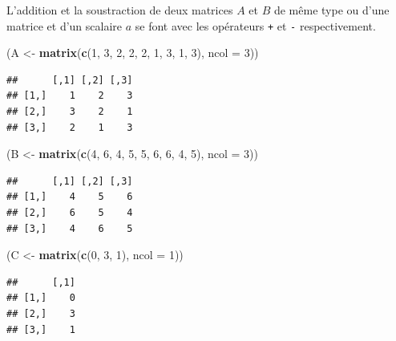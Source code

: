 \documentclass[
  11pt,
]{book}
\newenvironment{Shaded}{\begin{snugshade}}{\end{snugshade}}
\newcommand{\DataTypeTok}[1]{\textcolor[rgb]{0.13,0.29,0.53}{#1}}
\newcommand{\DecValTok}[1]{\textcolor[rgb]{0.00,0.00,0.81}{#1}}
\newcommand{\KeywordTok}[1]{\textcolor[rgb]{0.13,0.29,0.53}{\textbf{#1}}}
\newcommand{\NormalTok}[1]{#1}
\newcommand{\StringTok}[1]{\textcolor[rgb]{0.31,0.60,0.02}{#1}}
\numberwithin{equation}{section}
\numberwithin{countremarque}{section}
\begin{document}
L'addition et la soustraction de deux matrices \(A\) et \(B\) de même type ou d'une matrice et d'un scalaire \(a\) se font avec les opérateurs \texttt{+} et \texttt{-} respectivement.

\begin{Shaded}
\begin{Highlighting}[]
\NormalTok{(A \textless{}{-}}\StringTok{ }\KeywordTok{matrix}\NormalTok{(}\KeywordTok{c}\NormalTok{(}\DecValTok{1}\NormalTok{, }\DecValTok{3}\NormalTok{, }\DecValTok{2}\NormalTok{, }\DecValTok{2}\NormalTok{, }\DecValTok{2}\NormalTok{, }\DecValTok{1}\NormalTok{, }\DecValTok{3}\NormalTok{, }\DecValTok{1}\NormalTok{, }\DecValTok{3}\NormalTok{), }\DataTypeTok{ncol =} \DecValTok{3}\NormalTok{))}
\end{Highlighting}
\end{Shaded}

\begin{lstlisting}
##      [,1] [,2] [,3]
## [1,]    1    2    3
## [2,]    3    2    1
## [3,]    2    1    3
\end{lstlisting}

\begin{Shaded}
\begin{Highlighting}[]
\NormalTok{(B \textless{}{-}}\StringTok{ }\KeywordTok{matrix}\NormalTok{(}\KeywordTok{c}\NormalTok{(}\DecValTok{4}\NormalTok{, }\DecValTok{6}\NormalTok{, }\DecValTok{4}\NormalTok{, }\DecValTok{5}\NormalTok{, }\DecValTok{5}\NormalTok{, }\DecValTok{6}\NormalTok{, }\DecValTok{6}\NormalTok{, }\DecValTok{4}\NormalTok{, }\DecValTok{5}\NormalTok{), }\DataTypeTok{ncol =} \DecValTok{3}\NormalTok{))}
\end{Highlighting}
\end{Shaded}

\begin{lstlisting}
##      [,1] [,2] [,3]
## [1,]    4    5    6
## [2,]    6    5    4
## [3,]    4    6    5
\end{lstlisting}

\begin{Shaded}
\begin{Highlighting}[]
\NormalTok{(C \textless{}{-}}\StringTok{ }\KeywordTok{matrix}\NormalTok{(}\KeywordTok{c}\NormalTok{(}\DecValTok{0}\NormalTok{, }\DecValTok{3}\NormalTok{, }\DecValTok{1}\NormalTok{), }\DataTypeTok{ncol =} \DecValTok{1}\NormalTok{))}
\end{Highlighting}
\end{Shaded}

\begin{lstlisting}
##      [,1]
## [1,]    0
## [2,]    3
## [3,]    1
\end{lstlisting}
\end{document}
